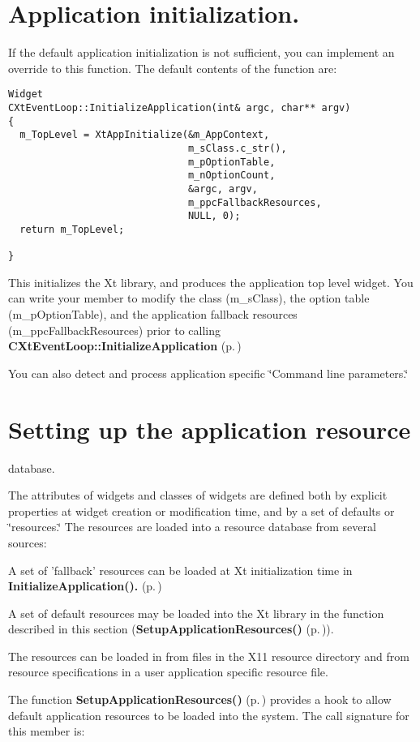 \section{Application initialization.}\label{InitializeApplication}
 If the default application initialization is not sufficient, you can implement an override to this function. The default contents of the function are: 

\footnotesize\begin{verbatim}Widget
CXtEventLoop::InitializeApplication(int& argc, char** argv)
{
  m_TopLevel = XtAppInitialize(&m_AppContext,
                               m_sClass.c_str(),
                               m_pOptionTable,
                               m_nOptionCount,
                               &argc, argv,
                               m_ppcFallbackResources,
                               NULL, 0);
  return m_TopLevel;

}
\end{verbatim}\normalsize 


This initializes the Xt library, and produces the application top level widget. You can write your member to modify the class (m\_\-s\-Class), the option table  (m\_\-p\-Option\-Table), and the application fallback resources  (m\_\-ppc\-Fallback\-Resources) prior to calling {\bf CXt\-Event\-Loop::Initialize\-Application} {\rm (p.\,\pageref{classCXtEventLoop_b6})}

You can also detect and process application specific \char`\"{}Command line parameters.\char`\"{}

\section{Setting up the application resource}\label{SetupApplicationResources}
 database.

The attributes of widgets and classes of widgets are defined both by explicit properties at widget creation or modification time, and by a set of  defaults or \char`\"{}resources.\char`\"{} The resources are loaded into a resource database from several sources:\begin{CompactItemize}
\item 
A set of 'fallback' resources can be loaded at Xt initialization time in {\bf Initialize\-Application().} {\rm (p.\,\pageref{classCXtEventLoop_b6})}\item 
A set of default resources may be loaded into the Xt library in the function  described in this section ({\bf Setup\-Application\-Resources()} {\rm (p.\,\pageref{classCXtEventLoop_b7})}).\item 
The resources can be loaded in from files in the X11 resource directory and from resource specifications in a user application specific resource file.\end{CompactItemize}
The function {\bf Setup\-Application\-Resources()} {\rm (p.\,\pageref{classCXtEventLoop_b7})} provides a hook to allow default application resources to be loaded into the system. The call signature for this member is: 

